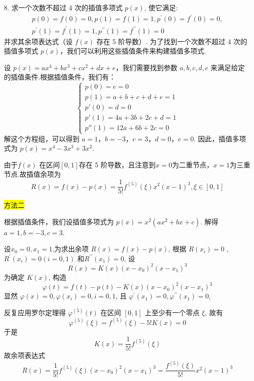 \begin{tcolorbox}[breakable,enhanced,arc=0mm,outer arc=0mm,
		boxrule=0pt,toprule=1pt,leftrule=0pt,bottomrule=1pt, rightrule=0pt,left=0.2cm,right=0.2cm,
		titlerule=0.5em,toptitle=0.1cm,bottomtitle=-0.1cm,top=0.2cm,
		colframe=white!10!biru,colback=white!90!biru,coltitle=white,
            coltext=black,title =2024-03-10, title style={white!10!biru}, before skip=8pt, after skip=8pt,before upper=\hspace{2em},
		fonttitle=\bfseries,fontupper=\normalsize]
  
8. 求一个次数不超过 4 次的插值多项式 $ p(x) $, 使它满足:
$$
\begin{array}{l}
p(0)=f(0)=0, p(1)=f(1)=1, p^{\prime}(0)=f^{\prime}(0)=0, \\
p^{\prime}(1)=f^{\prime}(1)=1, p^{\prime \prime}(1)=f^{\prime \prime}(1)=0
\end{array}
$$
并求其余项表达式（设 $ f(x) $ 存在 5 阶导数）.
 \tcblower
为了找到一个次数不超过 4 次的插值多项式 $p(x)$，我们可以利用这些插值条件来构建插值多项式.

设 $p(x) = ax^4 + bx^3 + cx^2 + dx + e$，我们需要找到参数 $a, b, c, d, e$ 来满足给定的插值条件.根据插值条件，我们有：
$$
\begin{cases}
p(0) = e = 0 \\
p(1) = a + b + c + d + e = 1 \\
p'(0) = d = 0 \\
p'(1) = 4a + 3b + 2c + d = 1 \\
p''(1) = 12a + 6b + 2c = 0
\end{cases}
$$
解这个方程组，可以得到 $a = 1$，$b = -3$，$c = 3$，$d = 0$，$e = 0$.
因此，插值多项式为 $p(x) = x^4 -3x^3 +3x^2$.

由于$ f(x) $ 在区间$[0,1]$存在 5 阶导数，且注意到$x=0$为二重节点，$x=1$为三重节点.故插值余项为
$$R(x) = f(x) - p(x)=\frac{1}{5 !} f^{(5)}(\xi) x^{2}(x-1)^{3}, \xi \in[0,1]$$


\colorbox{yellow}{方法二}

根据插值条件，我们设插值多项式为 $ p(x)=x^{2}(ax^{2}+bx+c) $. 解得 $ a=1, b=-3, c=3 $.

设$x_0=0,x_1=1$,为求出余项 $ R(x)=f(x)-p(x) $, 根据 $ R\left(x_{i}\right)=0 $ , $R^{\prime}\left(x_{i}\right)=0(i=0,1) $ 和$R^{\prime\prime}\left(x_{1}\right)=0 $, 设
$$
R(x)=K(x)\left(x-x_{0}\right)^2\left(x-x_{1}\right)^{3}
$$
为确定 $ K(x) $, 构造
$$
\varphi(t)=f(t)-p(t)-K(x)\left(x-x_{0}\right)^2\left(x-x_{1}\right)^{3}
$$
显然 $\varphi(x)=0, \varphi\left(x_{i}\right)=0, i=0,1 $, 且 $\varphi^{\prime}\left(x_{1}\right)=0,\varphi^{\prime\prime}\left(x_{1}\right)=0 $, 

反复应用罗尔定理得 $ \varphi^{(5)}(t) $ 在区间 $ [0, 1] $ 上至少有一个零点 $ \xi $, 故有
$$
\varphi^{(5)}(\xi)=f^{(5)}(\xi)-5 ! K(x)=0
$$
于是
$$
K(x)=\frac{1}{5 !} f^{(5)}(\xi)
$$
故余项表达式
$$
R(x)=\frac{1}{5 !} f^{(5)}(\xi)\left(x-x_{0}\right)^2\left(x-x_{1}\right)^{3}=\frac{f^{(5)}(\xi)}{5!}x^{2}(x-1)^{3}
$$


\end{tcolorbox}



